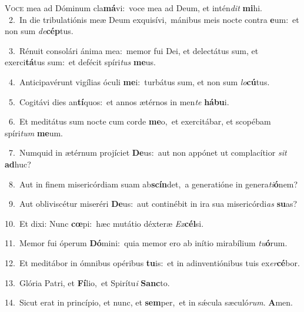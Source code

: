 \lettrine{\initial\textcolor{\initialcolor}{V}}{oce} mea ad Dóminum cla\-\textbf{má}\-vi:~\star voce mea ad Deum, et intén\textit{dit} \textbf{mi}\-hi.\\
{\numbfont\textcolor{\numbcolor}{~2.}}~In die tribulatiónis meæ Deum exquisívi,~\dagger mánibus meis nocte contra \textbf{e}\-um:~\star et non sum \textit{de}\-\textbf{cép}tus.\par
{\numbfont\textcolor{\numbcolor}{~3.}}~Rénuit consolári ánima mea:~\dagger memor fui Dei, et delectátus sum, et exerci\-\textbf{tá}\-tus sum:~\star et defécit spíri\textit{tus} \textbf{me}\-us.\par
{\numbfont\textcolor{\numbcolor}{~4.}}~Anticipavérunt vigílias óculi \textbf{me}\-i:~\star turbátus sum, et non sum \textit{lo}\-\textbf{cú}tus.\par
{\numbfont\textcolor{\numbcolor}{~5.}}~Cogitávi dies an\-\textbf{tí}\-quos:~\star et annos ætérnos in men\textit{te} \textbf{há}\-\textbf{bu}i.\par
{\numbfont\textcolor{\numbcolor}{~6.}}~Et meditátus sum nocte cum corde \textbf{me}\-o,~\star et exercitábar, et scopébam spíri\textit{tum} \textbf{me}\-um.\par
{\numbfont\textcolor{\numbcolor}{~7.}}~Numquid in ætérnum projíciet \textbf{De}\-us:~\star aut non appónet ut complacítior \textit{sit} \textbf{ad}\-huc?\par
{\numbfont\textcolor{\numbcolor}{~8.}}~Aut in finem misericórdiam suam ab\-\textbf{scín}\-det,~\star a generatióne in genera\-\textit{ti}\-\textbf{ó}nem?\par
{\numbfont\textcolor{\numbcolor}{~9.}}~Aut obliviscétur miseréri \textbf{De}\-us:~\star aut continébit in ira sua misericórdi\textit{as} \textbf{su}\-as?\par
{\numbfont\textcolor{\numbcolor}{10.}}~Et dixi: Nunc \textbf{cœ}\-pi:~\star hæc mutátio déxteræ \textit{Ex}\-\textbf{cél}si.\par
{\numbfont\textcolor{\numbcolor}{11.}}~Memor fui óperum \textbf{Dó}\-mini:~\star quia memor ero ab inítio mirabílium \textit{tu}\-\textbf{ó}rum.\par
{\numbfont\textcolor{\numbcolor}{12.}}~Et meditábor in ómnibus opéribus \textbf{tu}\-is:~\star et in adinventiónibus tuis ex\-\textit{er}\-\textbf{cé}bor.\par
{\numbfont\textcolor{\numbcolor}{13.}}~Glória Patri, et \textbf{Fí}\-lio,~\star et Spirítu\textit{i} \textbf{Sanc}\-to.\par
{\numbfont\textcolor{\numbcolor}{14.}}~Sicut erat in princípio, et nunc, et \textbf{sem}\-per,~\star et in sǽcula sæculó\-\textit{rum}\-. \textbf{A}\-men.\par

